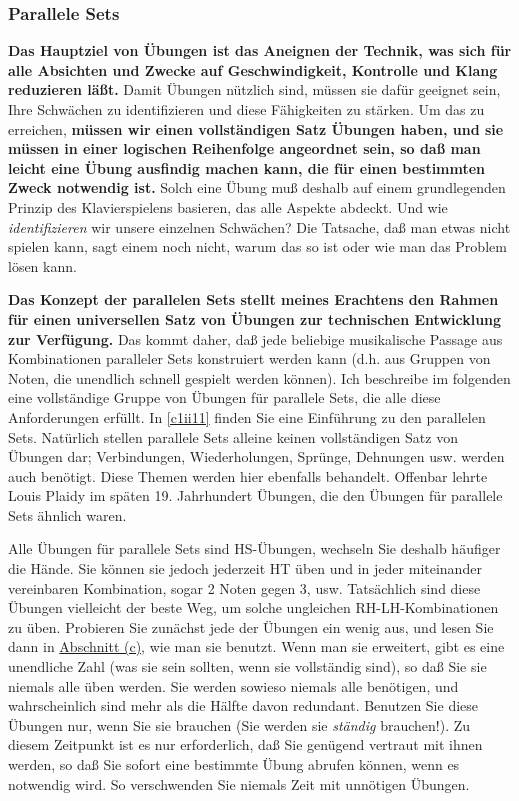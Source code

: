 
\subsubsection{Parallele Sets}
\label{c1iii7b}

\textbf{Das Hauptziel von Übungen ist das Aneignen der Technik, was sich für alle Absichten und Zwecke auf Geschwindigkeit, Kontrolle und Klang reduzieren läßt.}
Damit Übungen nützlich sind, müssen sie dafür geeignet sein, Ihre Schwächen zu identifizieren und diese Fähigkeiten zu stärken.
Um das zu erreichen, \textbf{müssen wir einen vollständigen Satz Übungen haben, und sie müssen in einer logischen Reihenfolge angeordnet sein, so daß man leicht eine Übung ausfindig machen kann, die für einen bestimmten Zweck notwendig ist.}
Solch eine Übung muß deshalb auf einem grundlegenden Prinzip des Klavierspielens basieren, das alle Aspekte abdeckt.
Und wie \textit{identifizieren} wir unsere einzelnen Schwächen?
Die Tatsache, daß man etwas nicht spielen kann, sagt einem noch nicht, warum das so ist oder wie man das Problem lösen kann.

\textbf{Das Konzept der parallelen Sets stellt meines Erachtens den Rahmen für einen universellen Satz von Übungen zur technischen Entwicklung zur Verfügung.}
Das kommt daher, daß jede beliebige musikalische Passage aus Kombinationen paralleler Sets konstruiert werden kann (d.h. aus Gruppen von Noten, die unendlich schnell gespielt werden können).
Ich beschreibe im folgenden eine vollständige Gruppe von Übungen für parallele Sets, die alle diese Anforderungen erfüllt.
In \hyperref[c1ii11]{\autoref{c1ii11}} finden Sie eine Einführung zu den parallelen Sets.
Natürlich stellen parallele Sets alleine keinen vollständigen Satz von Übungen dar; Verbindungen, Wiederholungen, Sprünge, Dehnungen usw. werden auch benötigt.
Diese Themen werden hier ebenfalls behandelt.
Offenbar lehrte Louis Plaidy im späten 19. Jahrhundert Übungen, die den Übungen für parallele Sets ähnlich waren.

Alle Übungen für parallele Sets sind HS-Übungen, wechseln Sie deshalb häufiger die Hände.
Sie können sie jedoch jederzeit HT üben und in jeder miteinander vereinbaren Kombination, sogar 2 Noten gegen 3, usw.
Tatsächlich sind diese Übungen vielleicht der beste Weg, um solche ungleichen RH-LH-Kombinationen zu üben.
Probieren Sie zunächst jede der Übungen ein wenig aus, und lesen Sie dann in \hyperref[c1iii7c]{Abschnitt (c)}, wie man sie benutzt.
Wenn man sie erweitert, gibt es eine unendliche Zahl (was sie sein sollten, wenn sie vollständig sind), so daß Sie sie niemals alle üben werden.
Sie werden sowieso niemals alle benötigen, und wahrscheinlich sind mehr als die Hälfte davon redundant.
Benutzen Sie diese Übungen nur, wenn Sie sie brauchen (Sie werden sie \textit{ständig} brauchen!).
Zu diesem Zeitpunkt ist es nur erforderlich, daß Sie genügend vertraut mit ihnen werden, so daß Sie sofort eine bestimmte Übung abrufen können, wenn es notwendig wird.
So verschwenden Sie niemals Zeit mit unnötigen Übungen.


